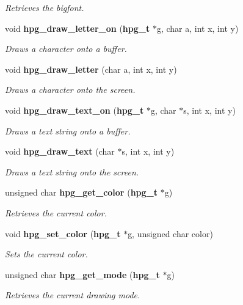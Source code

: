 \begin{CompactItemize}
\begin{CompactList}\small\item\em Retrieves the bigfont.\item\end{CompactList}\item 
void {\bf hpg\_\-draw\_\-letter\_\-on} ({\bf hpg\_\-t} $\ast$g, char a, int x, int y)
\begin{CompactList}\small\item\em Draws a character onto a buffer.\item\end{CompactList}\item 
void {\bf hpg\_\-draw\_\-letter} (char a, int x, int y)
\begin{CompactList}\small\item\em Draws a character onto the screen.\item\end{CompactList}\item 
void {\bf hpg\_\-draw\_\-text\_\-on} ({\bf hpg\_\-t} $\ast$g, char $\ast$s, int x, int y)
\begin{CompactList}\small\item\em Draws a text string onto a buffer.\item\end{CompactList}\item 
void {\bf hpg\_\-draw\_\-text} (char $\ast$s, int x, int y)
\begin{CompactList}\small\item\em Draws a text string onto the screen.\item\end{CompactList}\item 
unsigned char {\bf hpg\_\-get\_\-color} ({\bf hpg\_\-t} $\ast$g)
\begin{CompactList}\small\item\em Retrieves the current color.\item\end{CompactList}\item 
void {\bf hpg\_\-set\_\-color} ({\bf hpg\_\-t} $\ast$g, unsigned char color)
\begin{CompactList}\small\item\em Sets the current color.\item\end{CompactList}\item 
unsigned char {\bf hpg\_\-get\_\-mode} ({\bf hpg\_\-t} $\ast$g)
\begin{CompactList}\small\item\em Retrieves the current drawing mode.\item\end{CompactList}\item 

\end{CompactItemize}
